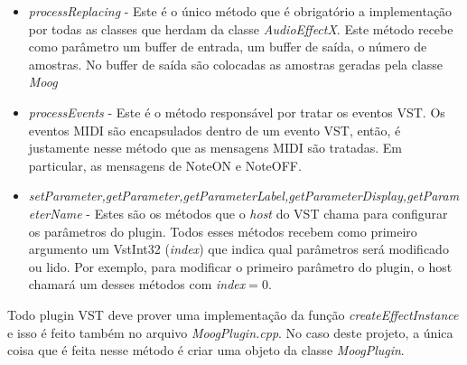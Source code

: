 \documentclass{article}
\begin{document}
\begin{itemize}
	\item \emph{processReplacing} - Este é o único método que é obrigatório a implementação 
	por todas as classes que herdam da classe \emph{AudioEffectX}. Este método recebe como parâmetro 
	um buffer de entrada, um buffer de saída, o número de amostras. No buffer de saída são colocadas 
	as amostras geradas pela classe \emph{Moog}
	\item \emph{processEvents} - Este é o método responsável por tratar os eventos VST. 
	Os eventos MIDI são encapsulados dentro de um evento VST, então, é justamente nesse 
	método que as mensagens MIDI são tratadas. Em particular, as mensagens de NoteON e 
	NoteOFF.
	\item \emph{setParameter,getParameter,getParameterLabel,getParameterDisplay,getParameterName} - 
	Estes são os métodos que o \emph{host} do VST chama para configurar os parâmetros do plugin. 
	Todos esses métodos recebem como primeiro argumento um VstInt32 (\emph{index}) que indica qual 
	parâmetros será modificado ou lido. Por exemplo, para modificar o primeiro parâmetro 
	do plugin, o host chamará um desses métodos com \emph{index}$=0$.
\end{itemize}

Todo plugin VST deve prover uma implementação da função \emph{createEffectInstance} e isso 
é feito também no arquivo \emph{MoogPlugin.cpp}. No caso deste projeto, a única coisa 
que é feita nesse método é criar uma objeto da classe \emph{MoogPlugin}. 


\end{document}

